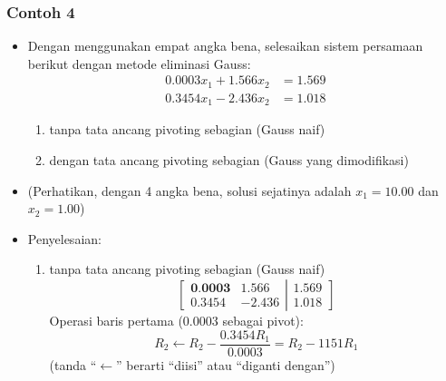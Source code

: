 \documentclass[pdflatex,compress,mathserif]{beamer}
\begin{document}
\begin{frame}
	\frametitle{Contoh 4}
	\begin{itemize}
		\item Dengan menggunakan empat angka bena, selesaikan sistem persamaan berikut dengan metode eliminasi Gauss:
		\begin{align*}
			0.0003x_1 + 1.566x_2 &= 1.569 \\
			0.3454x_1 - 2.436x_2 &= 1.018
		\end{align*}
		\begin{enumerate}
			\item tanpa tata ancang pivoting sebagian (Gauss naif)
			\item dengan tata ancang pivoting sebagian (Gauss yang dimodifikasi)
		\end{enumerate}
		\item (Perhatikan, dengan 4 angka bena, solusi sejatinya adalah $ x_1 = 10.00 $ dan $ x_2 = 1.00 $)
	\end{itemize}
\end{frame}

\begin{frame}
	\begin{itemize}
		\item Penyelesaian:
		\begin{enumerate}
			\item tanpa tata ancang pivoting sebagian (Gauss naif)
			\[
			\left[
				\begin{matrix}
				\textbf{0.0003} & 1.566 \\
				0.3454 & -2.436
				\end{matrix}
			\right|			
			\left.
			\begin{matrix}
				1.569 \\ 1.018
			\end{matrix}
			\right]
			\]
			Operasi baris pertama (0.0003 sebagai pivot):
			\[ R_2 \leftarrow R_2 - \frac{0.3454 R_1}{0.0003} = R_2 - 1151R_1\]
			(tanda “$\leftarrow$” berarti “diisi” atau “diganti dengan”)
		\end{enumerate}
	\end{itemize}
\end{frame}
\end{document}
